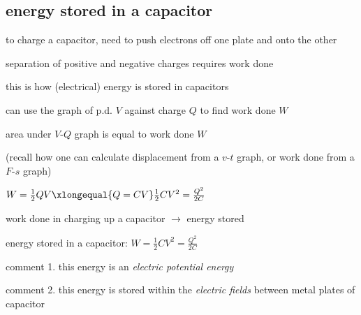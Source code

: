 \subsection{energy stored in a capacitor}

to charge a capacitor, need to push electrons off one plate and onto the other

separation of positive and negative charges requires work done

this is how (electrical) energy is stored in capacitors

%

\begin{wrapfigure}{l}{6.4cm}
\vspace*{-8pt}
\centering
{}
\end{wrapfigure}

can use the graph of p.d. $V$ against charge $Q$ to find work done $W$

area under $V$-$Q$ graph is equal to work done $W$

(recall how one can calculate displacement from a $v$-$t$ graph, or work done from a $F$-$s$ graph)

$W = \frac{1}{2} QV \xlongequal{Q=CV} \frac{1}{2}CV^2 = \frac{Q^2}{2C}$


work done in charging up a capacitor $\longrightarrow$ energy stored

energy stored in a capacitor: $\boxed{W = \frac{1}{2}CV^2 = \frac{Q^2}{2C}}$

\begin{compactitem}
\item comment 1. this energy is an \emph{electric potential energy}

\item comment 2. this energy is stored within the \emph{electric fields} between metal plates of capacitor
\end{compactitem}

